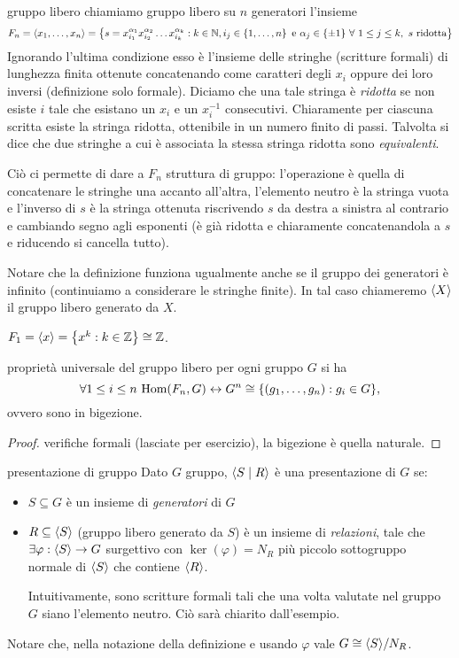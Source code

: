 \begin{definition}{gruppo libero}
    chiamiamo gruppo libero su $n$ generatori l'insieme
    \[ F_n = \langle x_1, \dots, x_n \rangle = \left\{ s = x_{i_1}^{\alpha_1} x_{i_2}^{\alpha_2} \dots x_{i_k}^{\alpha_k} : k \in \mathbb{N}, i_j \in \left\{ 1,\dots,n \right\} \text{ e } \alpha_j \in \{\pm 1\} \ \forall \  1 \leq j \leq k, \ s \text{ ridotta} \right\} \]
    Ignorando l'ultima condizione esso è l'insieme delle stringhe (scritture formali) di lunghezza finita ottenute concatenando come caratteri degli $x_i$ oppure dei loro inversi (definizione solo formale). Diciamo che una tale stringa è \textit{ridotta} se non esiste $i$ tale che esistano un $x_i$ e un $x_i ^{-1}$ consecutivi. Chiaramente per ciascuna scritta esiste la stringa ridotta, ottenibile in un numero finito di passi. Talvolta si dice che due stringhe a cui è associata la stessa stringa ridotta sono \textit{equivalenti}.
    
    Ciò ci permette di dare a $F_n$ struttura di gruppo: l'operazione è quella di concatenare le stringhe una accanto all'altra, l'elemento neutro è la stringa vuota e l'inverso di $s$ è la stringa ottenuta riscrivendo $s$ da destra a sinistra al contrario e cambiando segno agli esponenti (è già ridotta e chiaramente concatenandola a $s$ e riducendo si cancella tutto).
    
    Notare che la definizione funziona ugualmente anche se il gruppo dei generatori è infinito (continuiamo a considerare le stringhe finite). In tal caso chiameremo $\langle X \rangle$ il gruppo libero generato da $X$. 
\end{definition}
\begin{example}
    $F_1 = \langle x \rangle = \left\{ x^k : k \in \mathbb{Z} \right\} \cong \mathbb{Z}$.
\end{example}
\begin{proposition}{proprietà universale del gruppo libero}
    per ogni gruppo $G$ si ha \[ \forall 1 \leq i \leq n \ \text{Hom}(F_n, G) \leftrightarrow G^n \cong \{(g_1, \dots, g_n) : g_i \in G\}, \] ovvero sono in bigezione.
\end{proposition}
\begin{proof}
    verifiche formali (lasciate per esercizio), la bigezione è quella naturale. 
\end{proof}
\begin{definition}{presentazione di gruppo}
    Dato $G$ gruppo, $\langle S \mid R \rangle$ è una presentazione di $G$ se:
    \begin{itemize}
        \item $S\subseteq G$ è un insieme di \emph{generatori} di $G$
        \item $R \subseteq \langle S \rangle$ (gruppo libero generato da $S$) è un insieme di \emph{relazioni}, tale che $\exists \varphi: \langle S \rangle \rightarrow G$ surgettivo con $\ker(\varphi) = N_R$ più piccolo sottogruppo normale di $\langle S \rangle$ che contiene $\langle R \rangle$.

        Intuitivamente, sono scritture formali tali che una volta valutate nel gruppo $G$ siano l'elemento neutro. Ciò sarà chiarito dall'esempio.
    \end{itemize} 
    Notare che, nella notazione della definizione e usando $\varphi$ vale $G \cong \langle S \rangle/N_R$.
\end{definition}

